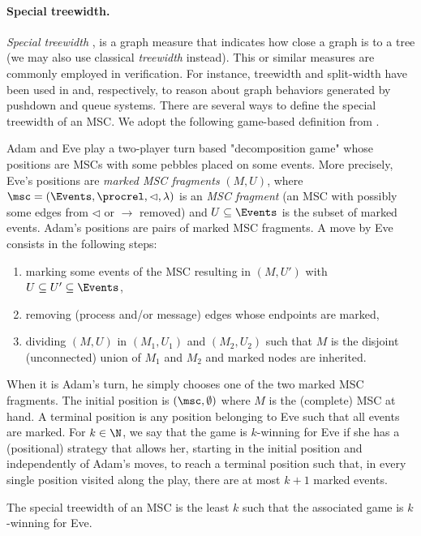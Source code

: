 \paragraph*{Special treewidth.}

\emph{Special treewidth} \cite{Courcelle10},
is a graph measure that indicates how close
a graph is to a tree (we may also use classical
	\emph{treewidth} instead).
This or similar measures are commonly employed in verification. For instance, treewidth and split-width have been used in \cite{MadhusudanP11} and, respectively, \cite{DBLP:conf/concur/CyriacGK12,AiswaryaGK14} to reason about graph behaviors generated by pushdown and queue systems.
There are several ways to define the special treewidth of an MSC.
We adopt the following game-based definition from \cite{DBLP:journals/corr/abs-1904-06942}.

Adam and Eve play a two-player turn based "decomposition game"
whose positions
are MSCs with some pebbles placed on some events.
More precisely, Eve's positions are
\emph{marked MSC fragments} $(M, U)$, where
$\msc = (\Events, \procrel, \lhd, \lambda)$
is an \emph{MSC fragment} (an MSC with possibly some edges from
$\lhd$ or $\to$ removed)
 and $U \subseteq \Events$ is the subset of marked events.
Adam's positions are pairs of marked MSC fragments.
A move by Eve consists in the following steps:
\begin{enumerate}
	\item marking some events of the MSC resulting in $(M, U')$ with $U \subseteq U' \subseteq \Events$,
	\item removing (process and/or message) edges whose endpoints are marked,
	\item dividing $(M, U)$ in $(M_1, U_1)$ and $(M_2, U_2)$ such that $M$ is the disjoint (unconnected) union of $M_1$ and $M_2$
	and marked nodes are inherited.
\end{enumerate}
When it is Adam's turn, he simply chooses one of the two marked MSC fragments.
The initial position is $(\msc,\emptyset)$ where $M$ is the (complete) MSC at hand. A terminal position is any position belonging to Eve such that all events are marked.
%
For $k \in \N$, we say that the game is $k$-winning for Eve if she has a (positional) strategy that allows her,
starting in the initial position and independently of Adam's moves, to reach a terminal position such that, in every single position visited along the play, there are at most $k+1$ marked events.

\begin{fact}
	The special treewidth of an MSC is the least $k$ such that
	the associated game is $k$-winning for Eve.
\end{fact}

